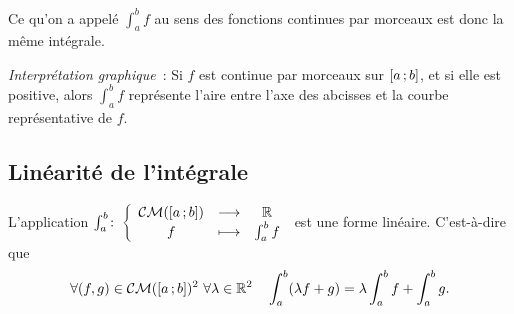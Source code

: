 Ce qu'on a appelé \(\int_a^b f\) au sens des fonctions continues par morceaux est donc la même intégrale.

\emph{Interprétation graphique}~: Si \(f\) est continue par morceaux sur \(\left[ a \, ;  b \right]\), et si elle est positive, alors \(\int_a^b f\) représente l'aire entre l'axe des abcisses et la courbe représentative de \(f\).

\subsection{Linéarité de l'intégrale}

\begin{theo}
  L'application \(\int_a^b\colon \left\{\begin{array}{ccc} \mathcal{CM}(\left[ a \, ;  b \right]) & \longrightarrow &\mathbb{R}\\ f & \longmapsto & \int_a^b f \end{array} \right.\) est une forme linéaire. C'est-à-dire que
  \begin{equation}
    \forall (f,g) \in \CM(\intervalleff{a}{b})^2 \ \forall \lambda \in \R^2 \quad \int_a^b (\lambda f+g) = \lambda \int_a^b f + \int_a^b g.
  \end{equation}
\end{theo}
